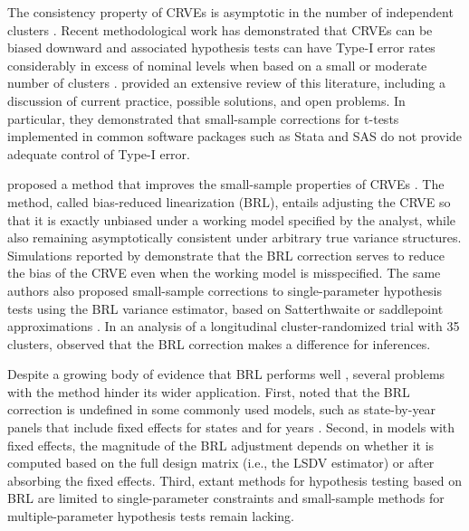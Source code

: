 \documentclass[12pt]{article}\usepackage[]{graphicx}\usepackage[]{color}
\begin{document}
The consistency property of CRVEs is asymptotic in the number of independent clusters \citep{Wooldridge2003cluster}.
Recent methodological work has demonstrated that CRVEs can be biased downward and associated hypothesis tests can have Type-I error rates considerably in excess of nominal levels when based on a small or moderate number of clusters \citep[e.g.,][]{MacKinnon2016wild}.
\citet{Cameron2015practitioners} provided an extensive review of this literature, including a discussion of current practice, possible solutions, and open problems. 
In particular, they demonstrated that small-sample corrections for t-tests implemented in common software packages such as Stata and SAS do not provide adequate control of Type-I error. 

\citet{Bell2002bias} proposed a method that improves the small-sample properties of CRVEs \citep[see also][]{McCaffrey2001generalizations}. 
The method, called bias-reduced linearization (BRL), entails adjusting the CRVE so that it is exactly unbiased under a working model specified by the analyst, while also remaining asymptotically consistent under arbitrary true variance structures. 
Simulations reported by \citet{Bell2002bias} demonstrate that the BRL correction serves to reduce the bias of the CRVE even when the working model is misspecified. 
The same authors also proposed small-sample corrections to single-parameter hypothesis tests using the BRL variance estimator, based on Satterthwaite \citep{Bell2002bias} or saddlepoint approximations \citep{McCaffrey2006improved}. 
In an analysis of a longitudinal cluster-randomized trial with 35 clusters, \citet{Angrist2009effects} observed that the BRL correction makes a difference for inferences. 

Despite a growing body of evidence that BRL performs well \citep[e.g.,][]{Imbens2015robust}, several problems with the method hinder its wider application. 
First, \citet{Angrist2009mostly} noted that the BRL correction is undefined in some commonly used models, such as state-by-year panels that include fixed effects for states and for years \citep[see also][]{Young2016improved}.
Second, in models with fixed effects, the magnitude of the BRL adjustment depends on whether it is computed based on the full design matrix (i.e., the LSDV estimator) or after absorbing the fixed effects.  
Third, extant methods for hypothesis testing based on BRL are limited to single-parameter constraints \citep{Bell2002bias, McCaffrey2006improved} and small-sample methods for multiple-parameter hypothesis tests remain lacking.
\end{document}
